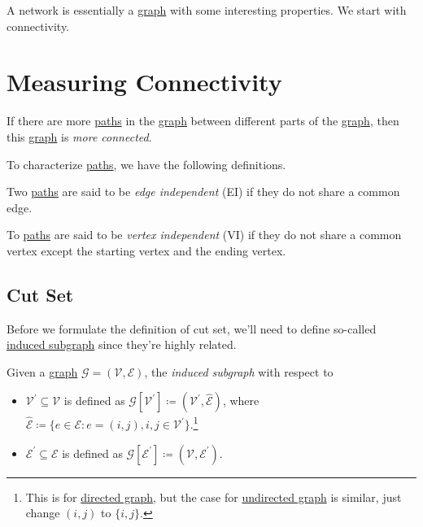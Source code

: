 A network is essentially a \hyperref[def:graph]{graph} with some interesting properties. We start with connectivity.

\section{Measuring Connectivity}
\begin{intuition}
	If there are more \hyperref[def:path]{paths} in the \hyperref[def:graph]{graph} between different parts of the \hyperref[def:graph]{graph}, then this \hyperref[def:graph]{graph} is \emph{more connected}.
\end{intuition}

To characterize \hyperref[def:path]{paths}, we have the following definitions.
\begin{definition}\label{def:edge-independent}
	Two \hyperref[def:path]{paths} are said to be \emph{edge independent} (EI) if they do not share a common edge.
\end{definition}

\begin{definition}\label{def:vertex-independent}
	To \hyperref[def:path]{paths} are said to be \emph{vertex independent} (VI) if they do not share a common vertex except the starting vertex and the ending vertex.
\end{definition}

\subsection{Cut Set}
Before we formulate the definition of cut set, we'll need to define so-called \hyperref[def:induced-subgraph]{induced subgraph} since they're highly related.

\begin{definition}\label{def:induced-subgraph}
	Given a \hyperref[def:graph]{graph} \(\mathcal{G} = (\mathcal{V} , \mathcal{E} )\), the \emph{induced subgraph} with respect to
	\begin{itemize}
		\item \(\mathcal{V}^\prime \subseteq \mathcal{V} \) is defined as \(\mathcal{G} [\mathcal{V} ^\prime ] \coloneqq (\mathcal{V} ^\prime, \hat{\mathcal{E}})\), where \(\hat{\mathcal{E} }\coloneqq \{e\in \mathcal{E} \colon e = (i, j), i, j\in \mathcal{V} ^\prime\}\).\footnote{This is for \hyperref[def:directed-graph]{directed graph}, but the case for \hyperref[def:undirected-graph]{undirected graph} is similar, just change \((i, j)\) to \(\{i, j\}\).}
		\item \(\mathcal{E}^\prime \subseteq \mathcal{E} \) is defined as \(\mathcal{G} [\mathcal{E} ^\prime ] \coloneqq (\mathcal{V} , \mathcal{E}^\prime )\).
	\end{itemize}
\end{definition}

